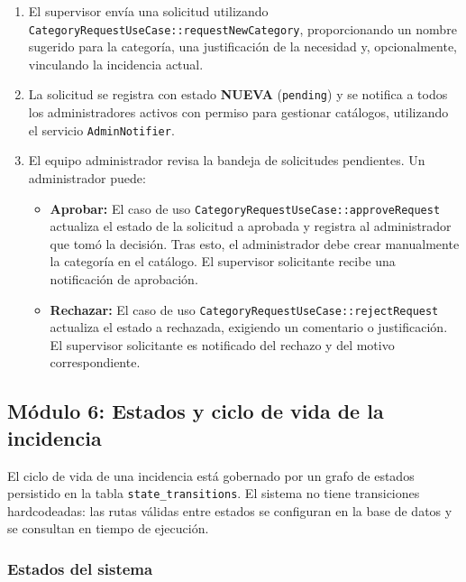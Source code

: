 \documentclass[12pt,a4paper]{article}
\begin{document}
\begin{enumerate}
    \item El supervisor envía una solicitud utilizando \texttt{CategoryRequestUseCase::requestNewCategory},
          proporcionando un nombre sugerido para la categoría, una justificación de la necesidad y,
          opcionalmente, vinculando la incidencia actual.
    \item La solicitud se registra con estado \textbf{NUEVA} (\texttt{pending}) y
          se notifica a todos los administradores activos con permiso para gestionar catálogos,
          utilizando el servicio \texttt{AdminNotifier}.
    \item El equipo administrador revisa la bandeja de solicitudes pendientes. Un administrador
          puede:
          \begin{itemize}
              \item \textbf{Aprobar:} El caso de uso \texttt{CategoryRequestUseCase::approveRequest}
                    actualiza el estado de la solicitud a aprobada y registra al administrador que
                    tomó la decisión. Tras esto, el administrador debe crear manualmente la categoría
                    en el catálogo. El supervisor solicitante recibe una notificación de aprobación.
              \item \textbf{Rechazar:} El caso de uso \texttt{CategoryRequestUseCase::rejectRequest}
                    actualiza el estado a rechazada, exigiendo un comentario o justificación. El supervisor
                    solicitante es notificado del rechazo y del motivo correspondiente.
          \end{itemize}
\end{enumerate}

\subsection{Módulo 6: Estados y ciclo de vida de la incidencia}

El ciclo de vida de una incidencia está gobernado por un grafo de estados
persistido en la tabla \texttt{state\_transitions}. El sistema no tiene
transiciones hardcodeadas: las rutas válidas entre estados se configuran en
la base de datos y se consultan en tiempo de ejecución.

\subsubsection*{Estados del sistema}
\end{document}
